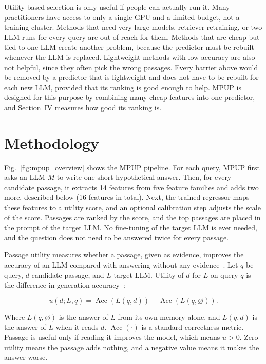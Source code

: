 \documentclass[conference]{IEEEtran}
\begin{document}
Utility-based selection is only useful if people can actually run it. Many practitioners have access to only a single GPU and a limited budget, not a training cluster. Methods that need very large models, retriever retraining, or two LLM runs for every query are out of reach for them. Methods that are cheap but tied to one LLM create another problem, because the predictor must be rebuilt whenever the LLM is replaced. Lightweight methods with low accuracy are also not helpful, since they often pick the wrong passages. Every barrier above would be removed by a predictor that is lightweight and does not have to be rebuilt for each new LLM, provided that its ranking is good enough to help. MPUP is designed for this purpose by combining many cheap features into one predictor, and Section~IV measures how good its ranking is.

\section{Methodology}
Fig.~\ref{fig:mpup_overview} shows the MPUP pipeline. For each query, MPUP first asks an
LLM $M$ to write one short hypothetical answer. Then, for every
candidate passage, it extracts 14 features from five feature families and adds two more, described below (16 features in total).
Next, the trained regressor maps these features to a utility score, and an
optional calibration step adjusts the scale of the score. Passages are ranked by the score, and the top passages are placed in the prompt
of the target LLM. No fine-tuning of the target LLM is ever needed, and the question does not need to be answered twice for every passage.


Passage utility measures whether a passage, given as evidence, improves
the accuracy of an LLM compared with answering without any evidence~\cite{zhang2026}. Let $q$ be query, $d$ candidate passage, and $L$
target LLM. Utility of $d$ for $L$ on query $q$ is the difference
in generation accuracy~\cite{zhang2026}:

\begin{equation}
    u(d;L,q)
    =
    \operatorname{Acc}(L(q,d))
    -
    \operatorname{Acc}(L(q,\varnothing)).
    \label{eq:utility}
\end{equation}

Where $L(q,\varnothing)$ is the answer of $L$ from its own memory alone,
and $L(q,d)$ is the answer of $L$ when it reads $d$.
$\operatorname{Acc}(\cdot)$ is a standard correctness metric. Passage
is useful only if reading it improves the model, which means $u>0$.
Zero utility means the passage adds nothing, and a negative value
means it makes the answer worse.
\end{document}
